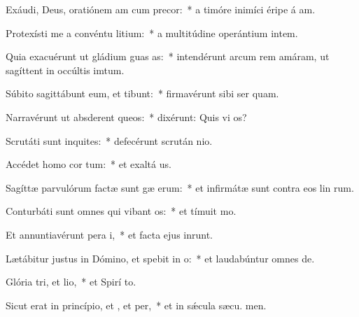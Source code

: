 \item Exáudi, Deus, oratiónem am cum precor:~* a timóre inimíci éripe á am.
\item Protexísti me a convéntu litium:~* a multitúdine operántium intem.
\item Quia exacuérunt ut gládium guas as:~* intendérunt arcum rem amáram, ut sagíttent in occúltis imtum.
\item Súbito sagittábunt eum, et  tibunt:~* firmavérunt sibi ser quam.
\item Narravérunt ut absderent queos:~* dixérunt: Quis vi os?
\item Scrutáti sunt inquites:~* defecérunt scrután nio.
\item Accédet homo  cor tum:~* et exaltá us.
\item Sagíttæ parvulórum factæ sunt gæ erum:~* et infirmátæ sunt contra eos lin rum.
\item Conturbáti sunt omnes qui vibant os:~* et tímuit  mo.
\item Et annuntiavérunt pera i,~* et facta ejus inrunt.
\item Lætábitur justus in Dómino, et spebit in o:~* et laudabúntur omnes  de.
\item Glória tri, et lio,~* et Spirí to.
\item Sicut erat in princípio, et , et per,~* et in sǽcula sæcu. men.
